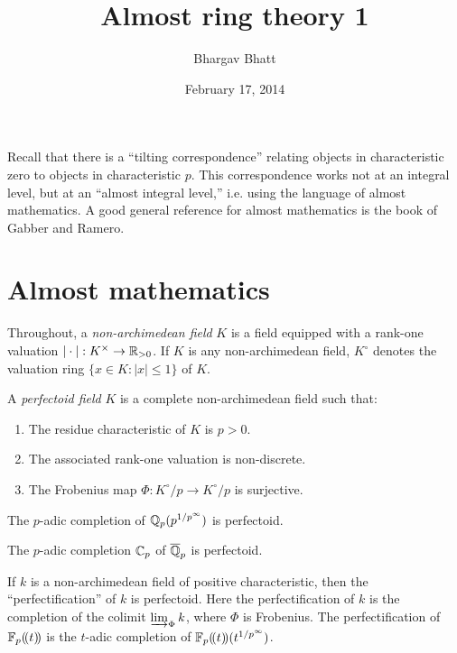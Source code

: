 \documentclass{article}
\title{Almost ring theory 1}
\author{Bhargav Bhatt}
\date{February 17, 2014}
\begin{document}
\maketitle





Recall that there is a ``tilting correspondence'' relating objects in characteristic 
zero to objects in characteristic $p$. This correspondence works not at an integral 
level, but at an ``almost integral level,'' i.e. using the language of almost 
mathematics. A good general reference for almost mathematics is the book \cite{gr03} 
of Gabber and Ramero. 





\section{Almost mathematics}

Throughout, a \emph{non-archimedean field} $K$ is a field equipped with a 
rank-one valuation $|\cdot|:K^\times \to \mathbb{R}_{>0}$. If $K$ is any 
non-archimedean field, $K^\circ$ denotes the valuation ring 
$\{x\in K:|x|\leqslant 1\}$ of $K$. 

\begin{definition}
A \emph{perfectoid field} $K$ is a complete non-archimedean field such that: 
\begin{enumerate}
  \item The residue characteristic of $K$ is $p>0$. 
  \item The associated rank-one valuation is non-discrete. 
  \item The Frobenius map $\Phi:K^\circ/p \to K^\circ/p$ is surjective. 
\end{enumerate}
\end{definition}

\begin{example}
The $p$-adic completion of $\mathbb{Q}_p(p^{1/p^\infty})$ is perfectoid. 
\end{example} 

\begin{example}
The $p$-adic completion $\mathbb{C}_p$ of $\overline{\mathbb{Q}}_p$ is perfectoid. 
\end{example}

\begin{example}
If $k$ is a non-archimedean field of positive characteristic, then the 
``perfectification'' of $k$ is perfectoid. Here the perfectification of 
$k$ is the completion of the colimit $\varinjlim_\Phi k$, where $\Phi$ is 
Frobenius. The perfectification of $\mathbb{F}_p(\!( {t} )\!)$ is the $t$-adic completion of 
$\mathbb{F}_p(\!( {t} )\!)(t^{1/p^\infty})$. 
\end{example}
\end{document}
